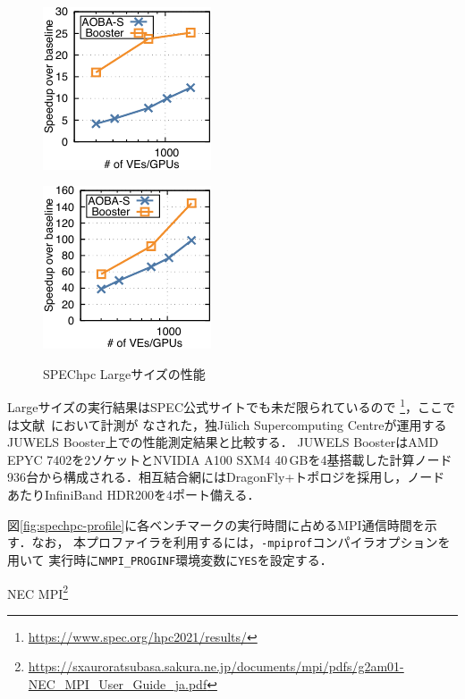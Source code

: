 ﻿\documentclass[submit,techrep,noauthor]{ipsj}
\begin{document}
\begin{figure}[tb]
\begin{minipage}[b]{0.45\hsize}
    \label{fig:pot3d-l}
  \end{minipage} \\
  \begin{minipage}[b]{0.45\hsize}
    \centering
    \includegraphics{figs/spechpc_hpgmgfv_l.pdf}
    \label{fig:hpgmg-l}
  \end{minipage}
  \begin{minipage}[b]{0.45\hsize}
    \centering
    \includegraphics{figs/spechpc_weather_l.pdf}
    \label{fig:weather-l}
  \end{minipage}
  \caption{SPEChpc Largeサイズの性能}\label{ラベル}
\end{figure}

Largeサイズの実行結果はSPEC公式サイトでも未だ限られているので
\footnote{\url{https://www.spec.org/hpc2021/results/}}，ここでは文献~\cite{Brunst2022}において計測が
なされた，独J\"{u}lich Supercomputing Centreが運用するJUWELS Booster上での性能測定結果と比較する．
JUWELS BoosterはAMD EPYC 7402を2ソケットとNVIDIA A100 SXM4
40\,GBを4基搭載した計算ノード936台から構成される．相互結合網にはDragonFly+トポロジを採用し，ノード
あたりInfiniBand HDR200を4ポート備える．

図\ref{fig:spechpc-profile}に各ベンチマークの実行時間に占めるMPI通信時間を示す．なお，
本プロファイラを利用するには，\verb|-mpiprof|コンパイラオプションを用いて
実行時に\verb|NMPI_PROGINF|環境変数に\verb|YES|を設定する．

NEC MPI\footnote{\url{https://sxauroratsubasa.sakura.ne.jp/documents/mpi/pdfs/g2am01-NEC_MPI_User_Guide_ja.pdf}}
\end{document}
